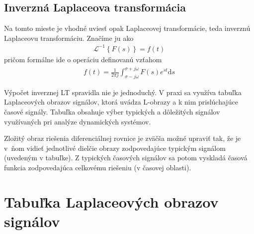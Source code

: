 \documentclass[a4paper, 10pt, ]{article}
\begin{document}
\subsection{Inverzná Laplaceova transformácia}

Na tomto mieste je vhodné uviesť opak Laplaceovej transformácie, teda inverznú Laplaceovu transformáciu. Značíme ju ako
\begin{align}
    \mathcal L ^{-1} \left\{ F(s) \right\} = f(t)
\end{align}
pričom formálne ide o operáciu definovanú vzťahom
\begin{align}
    f(t) = \frac{1}{2\pi j} \int_{\sigma-j\omega}^{\sigma + j\omega} F(s) e^{st} \text{d}s
\end{align}

Výpočet inverznej LT spravidla nie je jednoduchý. V praxi sa využíva tabuľka Laplaceových obrazov signálov, ktorá uvádza L-obrazy a k nim prislúchajúce časové signály. Tabuľka obsahuje výber typických a dôležitých signálov využívaných pri analýze dynamických systémov.

Zložitý obraz riešenia diferenciálnej rovnice je zväčša možné upraviť tak, že je v~ňom vidieť jednotlivé dielčie obrazy zodpovedajúce typickým signálom (uvedeným v tabuľke). Z typických časových signálov sa potom vyskladá časová funkcia zodpovedajúca celkovému riešeniu (v časovej oblasti).






\section{Tabuľka Laplaceových obrazov signálov}




\newcommand{\Laplace}[1]{\ensuremath{\mathcal{L}{\left\{#1\right\}}}}
\newcommand{\InvLap}[1]{\ensuremath{\mathcal{L}^{-1}{\left\{#1\right\}}}}
\end{document}
